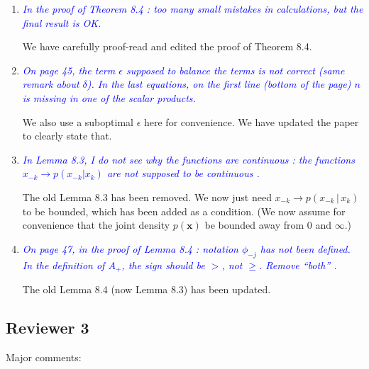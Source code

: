 \documentclass[pdftex,12pt]{article}
\def\rc#1{{\it\textcolor{blue}{#1}}\smallskip}
\begin{document}
\begin{enumerate}
\item \rc{In the proof of Theorem 8.4 : too many small mistakes in
calculations, but the final result is OK.}

We have carefully proof-read and edited the proof of Theorem 8.4. 

\item \rc{On page 45, the term $\epsilon$ supposed to balance the terms is not correct
(same remark about $\delta$). In the last equations, on the first line (bottom
of the page) $n$ is missing in one of the scalar products.}

We also use a suboptimal $\epsilon$ here for convenience. We have updated the paper to clearly state that.

\item \rc{In Lemma 8.3, I do not see why the functions are continuous : the
functions $x_{-k} \rightarrow p(x_{-k} | x_k)$ are not supposed to be continuous .}

The old Lemma 8.3 has been removed. We now just need $x_{-k} \rightarrow p(x_{-k} \,|\, x_k)$ to be bounded, which has been added as a condition. (We now assume for convenience that the joint density $p(\mathbf{x})$ be bounded away from 0 and $\infty$.)

\item \rc{On page 47, in the proof of Lemma 8.4 : notation $\phi_{-j}$
  has not been defined.
In the definition of $A_+$, the sign should be $>$, not $\geq$. Remove ``both'' .}

The old Lemma 8.4 (now Lemma 8.3) has been updated. 


\end{enumerate}

\subsection*{Reviewer 3}


Major comments:
\end{document}
